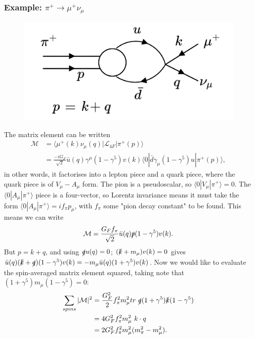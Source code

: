 \documentclass[a4paper,12pt]{article}
\begin{document}
\subsubsection{Example:  $\pi^+ \to \mu^+ \nu_\mu$}
\begin{figure}
  \centering
  \includegraphics[width=\linewidth]{figs/diag_2.png}
\end{figure}
The matrix element can be written 
\begin{equation}
\begin{split}
    \mathcal{M} &= \langle \mu^+(k) \nu_\mu(q) | \mathcal{L}_{4F} | \pi^+(p) \rangle \\
    &= \frac{-iG_F}{\sqrt{2}} \bar{u}(q)\gamma^\mu(1-\gamma^5)v(k) \langle 0 | \bar{d}\gamma_\mu(1-\gamma^5)u | \pi^+(p) \rangle,
\end{split}
\end{equation}
in other words, it factorises into a lepton piece and a quark piece, where the quark piece is of $V_\mu - A_\mu$ form. The pion is a pseudoscalar, so $\langle 0 | V_\mu | \pi^+ \rangle = 0$. The $\langle 0 | A_\mu | \pi^+ \rangle$ piece is a four-vector, so Lorentz invariance means it must take the form $\langle 0 | A_\mu | \pi^+ \rangle = i f_\pi p_\mu$, with $f_\pi$ some "pion decay constant" to be found. This means we can write
\begin{equation}
    \mathcal{M} = \frac{G_F f_\pi}{\sqrt{2}}\bar{u}(q)\slashed{p}(1-\gamma^5)v(k).
\end{equation}
But $p = k + q$, and using $\slashed{q}u(q)=0$; $(\slashed{k} + m_\mu)v(k)=0$ gives $\bar{u}(q)(\slashed{k} + \slashed{q})(1-\gamma^5)v(k) = -m_\mu \bar{u}(q)(1+ \gamma^5) v(k)$. Now we would like to evaluate the spin-averaged matrix element squared, taking note that $(1+\gamma^5)m_\mu(1-\gamma^5)=0$:
\begin{equation}
\begin{split}
\sum_{spins}|\mathcal{M}|^2 &= \frac{G_F^2}{2} f_\pi^2 m_\mu^2 tr\ \slashed{q}(1+\gamma^5) \slashed{k} (1-\gamma^5) \\
&= 4G_F^2 f_\pi^2 m_\mu^2\ k \cdot q \\
&= 2G_F^2 f_\pi^2 m_\mu^2(m_\pi^2 - m_\mu^2).
\end{split}
\end{equation}
\end{document}
